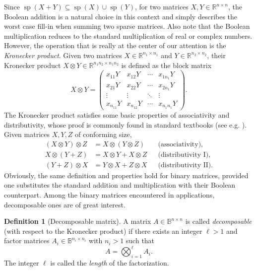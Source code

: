 \documentclass{article}
\numberwithin{equation}{section}
\DeclareMathOperator{\sparsity}{\operatorname{sp}}
\theoremstyle{definition}
\newtheorem{definition}{Definition}[section]
\begin{document}
Since $\sparsity(X+Y) \subseteq \sparsity(X) \cup \sparsity(Y)$, for two matrices $X,Y \in \mathbb{R}^{n \times n}$, the Boolean addition is a natural choice in this context and simply describes the worst case fill-in when summing two sparse matrices. Also note that the Boolean multiplication reduces to the standard multiplication of real or complex numbers. However, the operation that is really at the center of our attention is the \emph{Kronecker product}. Given two matrices $X \in \mathbb{R}^{n_1 \times n_1}$ and $Y \in \mathbb{R}^{n_2 \times n_2}$, their Kronecker product $X \otimes Y \in \mathbb{R}^{n_1n_2 \times n_1n_2}$ is defined as the block matrix
\begin{equation*}
X \otimes Y = 
\begin{pmatrix}
x_{11}Y & x_{12}Y & \cdots & x_{1n_1}Y \\
x_{21}Y & x_{22}Y & \cdots & x_{2n_1}Y \\
\vdots  & \vdots  & \ddots & \vdots \\
x_{n_11}Y & x_{n_12}Y & \cdots & x_{n_1n_1}Y
\end{pmatrix}.
\end{equation*}
The Kronecker product satisfies some basic properties of associativity and distributivity, whose proof is commonly found in standard textbooks (see e.g. \cite{horn1991topics}). Given matrices $X,Y,Z$ of conforming size,
\begin{align*}
    (X \otimes Y) \otimes Z &= X \otimes (Y \otimes Z) & &\text{(associativity)}, \\
    X \otimes (Y + Z) &= X \otimes Y + X \otimes Z & &\text{(distributivity I)}, \\
    (Y + Z) \otimes X &= Y \otimes X + Z \otimes X & &\text{(distributivity II)}. 
\end{align*}
Obviously, the same definition and properties hold for binary matrices, provided one substitutes the standard addition and multiplication with their Boolean counterpart. Among the binary matrices encountered in applications, decomposable ones are of great interest.

\begin{definition}[Decomposable matrix]
\label{def: decomposable_mat}
A matrix $A \in \mathbb{B}^{n \times n}$ is called \emph{decomposable} (with respect to the Kronecker product) if there exists an integer $\ell>1$ and factor matrices $A_i \in \mathbb{B}^{n_i \times n_i}$ with $n_i > 1$ such that
\begin{equation}
\label{eq: decomposition}
A = \bigotimes_{i=1}^{\ell} A_i.
\end{equation}
The integer $\ell$ is called the \emph{length} of the factorization.
\end{definition}
\end{document}

